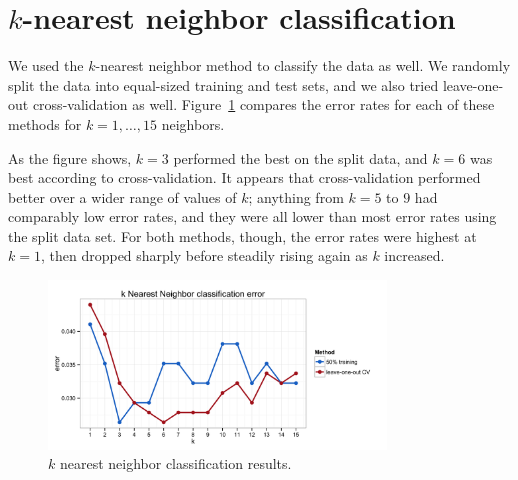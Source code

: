 \documentclass[12pt]{article}
\begin{document}
\section{$k$-nearest neighbor classification}

We used the $k$-nearest neighbor method to classify the data as well. We randomly split the data into equal-sized training and test sets, and we also tried leave-one-out cross-validation as well. Figure~\ref{fig:knn1} compares the error rates for each of these methods for $k = 1, \dots, 15$ neighbors.

As the figure shows, $k=3$ performed the best on the split data, and $k=6$ was best according to cross-validation. It appears that cross-validation performed better over a wider range of values of $k$; anything from $k=5$ to $9$ had comparably low error rates, and they were all lower than most error rates using the split data set. For both methods, though, the error rates were highest at $k=1$, then dropped sharply before steadily rising again as $k$ increased.

\begin{figure}
	\centering
	\includegraphics[width=0.8\textwidth]{knn1.png}
	\caption{$k$ nearest neighbor classification results.}
	\label{fig:knn1}
\end{figure}
\end{document}
